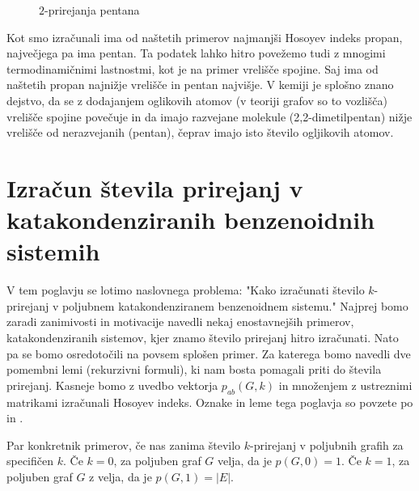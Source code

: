 \documentclass[mat1, tisk]{fmfdelo}
\begin{document}
\begin{zgled}
\begin{figure} [H]
\begin{center}
      \label{fig:pentan}
      \caption{$2$-prirejanja pentana}
    \end{center}
  \end{figure}


  Kot smo izračunali ima od naštetih primerov najmanjši Hosoyev indeks
  propan, največjega pa ima pentan. Ta podatek lahko hitro povežemo tudi z
  mnogimi termodinamičnimi lastnostmi, kot je na primer vrelišče spojine.
  Saj ima od naštetih propan najnižje vrelišče in pentan najvišje.
  V kemiji je splošno znano dejstvo, da se z dodajanjem oglikovih atomov 
  (v teoriji grafov so to vozlišča) vrelišče spojine povečuje in da imajo 
  razvejane molekule (2,2-dimetilpentan) nižje vrelišče 
  od nerazvejanih (pentan), čeprav imajo isto število ogljikovih atomov.
\end{zgled}









\section{Izračun števila prirejanj v katakondenziranih benzenoidnih sistemih}


V tem poglavju se lotimo naslovnega problema:
"Kako izračunati število $k$-prirejanj v poljubnem katakondenziranem benzenoidnem sistemu."
Najprej bomo zaradi zanimivosti in motivacije 
navedli nekaj enostavnejših primerov, 
katakondenziranih sistemov, kjer
znamo število prirejanj hitro izračunati.
Nato pa se bomo osredotočili na povsem splošen primer.
Za katerega bomo navedli dve pomembni lemi (rekurzivni formuli), 
ki nam bosta pomagali priti do števila prirejanj.
Kasneje bomo z uvedbo vektorja 
$p_{ab}(G,k)$ in množenjem z ustreznimi matrikami izračunali 
Hosoyev indeks.
Oznake in leme tega poglavja so povzete 
po \cite{GLAVNA DIPLOMSKA} in \cite{GLAVNA DIPLOMSKA}.


Par konkretnik primerov, če nas zanima število $k$-prirejanj 
v poljubnih grafih za specifičen $k$.
Če $k = 0$, za poljuben graf $G$ velja, da je $p(G,0) = 1$.
Če $k = 1$, za poljuben graf $G$ z velja, da je $p(G,1) = |E|$.
\end{document}
